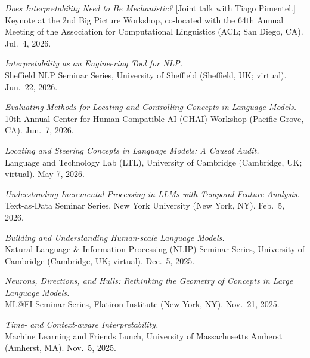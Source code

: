 \documentclass[10pt]{article}
\newcommand{\halfblankline}{\quad\vspace{-0.5\baselineskip}\pagebreak[3]}
\begin{document}
	\halfblankline

	\emph{Does Interpretability Need to Be Mechanistic?} [Joint talk with Tiago Pimentel.]\\
	Keynote at the 2nd Big Picture Workshop, co-located with the 64th Annual Meeting of the Association
	for Computational Linguistics (ACL; San Diego, CA). Jul.\ 4, 2026.

	\halfblankline
	
	\emph{Interpretability as an Engineering Tool for NLP.}\\
	Sheffield NLP Seminar Series, University of Sheffield (Sheffield, UK; virtual). Jun.\ 22, 2026.
	
	\halfblankline
	
	\emph{Evaluating Methods for Locating and Controlling Concepts in Language Models.}\\
	10th Annual Center for Human-Compatible AI (CHAI) Workshop (Pacific Grove, CA). Jun.\ 7, 2026.
	
	\halfblankline

	\emph{Locating and Steering Concepts in Language Models: A Causal Audit.}\\
	Language and Technology Lab (LTL), University of Cambridge (Cambridge, UK; virtual). May 7, 2026.

	\halfblankline
	
	\emph{Understanding Incremental Processing in LLMs with Temporal Feature Analysis.}\\
	Text-as-Data Seminar Series, New York University (New York, NY). Feb.\ 5, 2026.
	
	\halfblankline
	
	\emph{Building and Understanding Human-scale Language Models.}\\
	Natural Language \& Information Processing (NLIP) Seminar Series, University of Cambridge (Cambridge, UK; virtual). Dec.\ 5, 2025.

	\halfblankline

	\emph{Neurons, Directions, and Hulls: Rethinking the Geometry of Concepts in Large Language Models.}\\
	ML@FI Seminar Series, Flatiron Institute (New York, NY). Nov.\ 21, 2025.

	\halfblankline

	\emph{Time- and Context-aware Interpretability.}\\
	Machine Learning and Friends Lunch, University of Massachusetts Amherst (Amherst, MA). Nov.\ 5, 2025.

	\halfblankline
	
\end{document}
